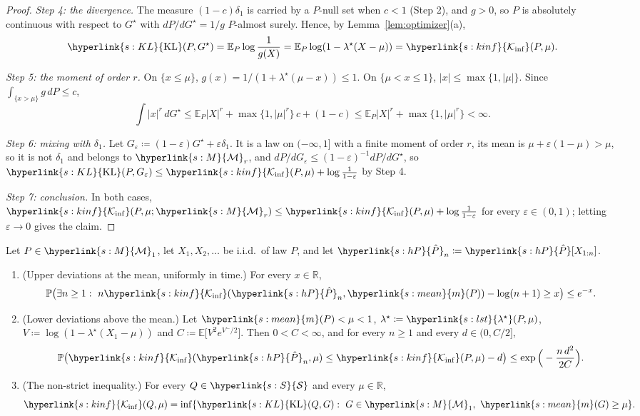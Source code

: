 \documentclass[11pt]{article}
\newcommand{\E}{\mathbb{E}}
\newcommand{\Prob}{\mathbb{P}}
\newcommand{\R}{\mathbb{R}}
\newcommand{\sy}[2]{{\hyperlink{#1}{#2}}}
\newcommand{\Sm}{\sy{s:S}{\mathcal{S}}}
\newcommand{\Mm}{\sy{s:M}{\mathcal{M}}}
\newcommand{\mean}{\sy{s:mean}{m}}
\newcommand{\KL}{\sy{s:KL}{\mathrm{KL}}}
\newcommand{\Kinf}{\sy{s:kinf}{\mathcal{K}_{\inf}}}
\newcommand{\hP}{\sy{s:hP}{\hat{P}}}
\newcommand{\lst}{\sy{s:lst}{\lambda^{\star}}}
\begin{document}
\begin{proof}
\emph{Step 4: the divergence.} The measure $(1-c)\delta_1$ is carried by a $P$-null set when $c<1$
(Step 2), and $g>0$, so $P$ is absolutely continuous with respect to $G^\star$ with
$dP/dG^\star=1/g$ $P$-almost surely. Hence, by Lemma~\ref{lem:optimizer}(a),
\[
  \KL(P,G^\star)=\E_P\log\frac1{g(X)}=\E_P\log(1-\lambda^\star(X-\mu))=\Kinf(P,\mu).
\]

\emph{Step 5: the moment of order $r$.} On $\{x\le\mu\}$, $g(x)=1/(1+\lambda^\star(\mu-x))\le1$. On
$\{\mu<x\le1\}$, $|x|\le\max\{1,|\mu|\}$. Since $\int_{\{x>\mu\}}g\,dP\le c$,
\[
  \int|x|^r\,dG^\star\le\E_P|X|^r+\max\{1,|\mu|^r\}\,c+(1-c)\le\E_P|X|^r+\max\{1,|\mu|^r\}<\infty.
\]

\emph{Step 6: mixing with $\delta_1$.} Let $G_\varepsilon\coloneqq(1-\varepsilon)G^\star+\varepsilon\delta_1$.
It is a law on $(-\infty,1]$ with a finite moment of order $r$, its mean is
$\mu+\varepsilon(1-\mu)>\mu$, so it is not $\delta_1$ and belongs to $\Mm_r$, and
$dP/dG_\varepsilon\le(1-\varepsilon)^{-1}dP/dG^\star$, so
$\KL(P,G_\varepsilon)\le\Kinf(P,\mu)+\log\frac1{1-\varepsilon}$ by Step 4.

\emph{Step 7: conclusion.} In both cases, $\Kinf(P,\mu;\Mm_r)\le\Kinf(P,\mu)+\log\frac1{1-\varepsilon}$
for every $\varepsilon\in(0,1)$; letting $\varepsilon\to0$ gives the claim.
\end{proof}

\begin{lemma}\label{lem:pa-assumptions}
Let $P\in\Mm_1$, let $X_1,X_2,\dots$ be i.i.d.\ of law $P$, and let $\hP_n\coloneqq\hP[X_{1:n}]$.
\begin{enumerate}[label=(\alph*)]
\item (Upper deviations at the mean, uniformly in time.) For every $x\in\R$,
  \[
    \Prob\big(\exists n\ge1:\ n\Kinf(\hP_n,\mean(P))-\log(n+1)\ge x\big)\le e^{-x}.
  \]
\item (Lower deviations above the mean.) Let $\mean(P)<\mu<1$, $\lambda^\star\coloneqq\lst(P,\mu)$,
  $V\coloneqq\log(1-\lambda^\star(X_1-\mu))$ and $C\coloneqq\E\big[V^2e^{V^-/2}\big]$. Then
  $0<C<\infty$, and for every $n\ge1$ and every $d\in(0,C/2]$,
  \[
    \Prob\big(\Kinf(\hP_n,\mu)\le\Kinf(P,\mu)-d\big)\le\exp\Big(-\frac{n\,d^2}{2C}\Big).
  \]
\item (The non-strict inequality.) For every $Q\in\Sm$ and every $\mu\in\R$,
  \[
    \Kinf(Q,\mu)=\inf\{\KL(Q,G):\ G\in\Mm_1,\ \mean(G)\ge\mu\}.
  \]
\end{enumerate}
\end{lemma}
\end{document}
